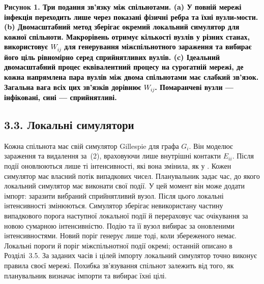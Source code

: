\documentclass[11pt,a4paper]{article}
\begin{document}
\begin{minipage}{\linewidth}
\par\small\textbf{Рисунок 1. \textcolor{black}{Три подання зв'язку між спільнотами. (a) У повній мережі інфекція переходить лише через показані фізичні ребра та їхні вузли-мости. (b) Двомасштабний метод зберігає окремий локальний симулятор для кожної спільноти. Макрорівень отримує кількості вузлів у різних станах, використовує $W_{ij}$ для генерування міжспільнотного зараження та вибирає його ціль рівномірно серед сприйнятливих вузлів. (c) Ідеальний двомасштабний процес еквівалентний процесу на сурогатній мережі, де кожна напрямлена пара вузлів між двома спільнотами має слабкий зв'язок. Загальна вага всіх цих зв'язків дорівнює $W_{ij}$. Помаранчеві вузли --- інфіковані, сині --- сприйнятливі.}}

\end{minipage}\par
\subsection*{3.3. Локальні симулятори}

Кожна спільнота має свій симулятор Gillespie для графа $G_i$. Він моделює зараження та видалення за~(2), враховуючи лише внутрішні контакти $E_{ii}$. Після події оновлюються лише ті інтенсивності, які вона змінила, як у \citet{kuryliak2025simulating}. Кожен симулятор має власний потік випадкових чисел.
Планувальник задає час, до якого локальний симулятор має виконати свої події. У цей момент він може додати імпорт: заразити вибраний сприйнятливий вузол. Після цього локальні інтенсивності змінюються. Симулятор зберігає невикористану частину випадкового порога наступної локальної події й перераховує час очікування за новою сумарною інтенсивністю. Подію та її вузол вибирає за оновленими інтенсивностями. Новий поріг генерує лише тоді, коли збереженого немає. Локальні пороги й поріг міжспільнотної події окремі; останній описано в Розділі~3.5. За заданих часів і цілей імпорту локальний симулятор точно виконує правила своєї мережі. Похибка зв'язування спільнот залежить від того, як планувальник визначає імпорти та вибирає їхні цілі.
\end{document}
